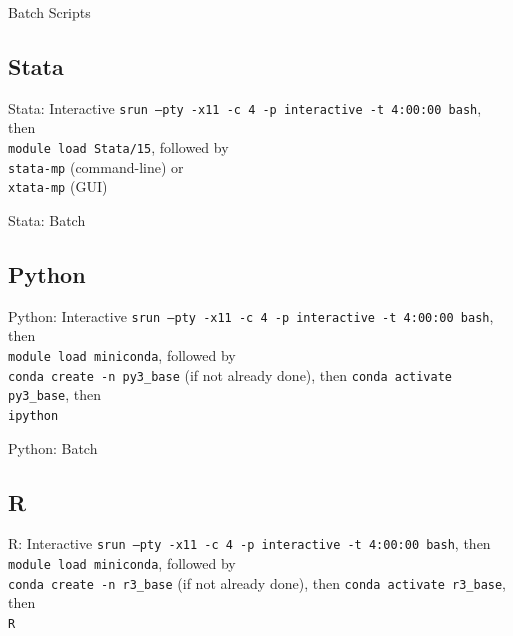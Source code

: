\documentclass[10pt,xcolor={svgnames}]{beamer}
\begin{document}
\begin{frame}[fragile]{Batch Scripts}

\end{frame}


\subsection{Stata}
\begin{frame}{Stata: Interactive}
\alert{\texttt{srun --pty -x11 -c 4 -p interactive -t 4:00:00 bash}}, then \\ 
\alert{\texttt{module load Stata/15}},  followed by  \\ 
\alert{\texttt{stata-mp}} (command-line) or \\ \alert{\texttt{xtata-mp}} (GUI)
\end{frame}

\begin{frame}{Stata: Batch}

\end{frame}

\subsection{Python}
\begin{frame}{Python: Interactive}
\alert{\texttt{srun --pty -x11 -c 4 -p interactive -t 4:00:00 bash}}, then \\ 
\alert{\texttt{module load miniconda}},  followed by  \\ 
\alert{\texttt{conda create -n py3\_base}} (if not already done), then
\alert{\texttt{conda activate py3\_base}}, then \\
\alert{\texttt{ipython}}
\end{frame}

\begin{frame}{Python: Batch}

\end{frame}

\subsection{R}
\begin{frame}{R: Interactive}
\alert{\texttt{srun --pty -x11 -c 4 -p interactive -t 4:00:00 bash}}, then \\ 
\alert{\texttt{module load miniconda}},  followed by  \\ 
\alert{\texttt{conda create -n r3\_base}} (if not already done), then
\alert{\texttt{conda activate r3\_base}}, then \\
\alert{\texttt{R}}
\end{frame}
\end{document}

